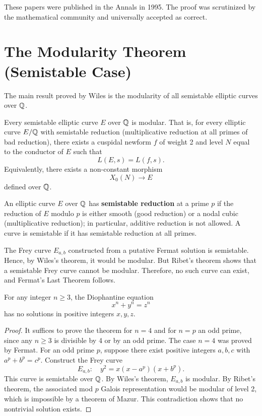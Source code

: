 These papers were published in the Annals in 1995. The proof was scrutinized by the mathematical community and universally accepted as correct.

\section{The Modularity Theorem (Semistable Case)}

The main result proved by Wiles is the modularity of all semistable elliptic curves over \(\mathbb{Q}\).

\begin{theorem}
Every semistable elliptic curve \(E\) over \(\mathbb{Q}\) is modular. That is, for every elliptic curve \(E/\mathbb{Q}\) with semistable reduction (multiplicative reduction at all primes of bad reduction), there exists a cuspidal newform \(f\) of weight 2 and level \(N\) equal to the conductor of \(E\) such that
\[
L(E,s) = L(f,s).
\]
Equivalently, there exists a non-constant morphism
\[
X_0(N) \to E
\]
defined over \(\mathbb{Q}\).
\end{theorem}

An elliptic curve \(E\) over \(\mathbb{Q}\) has \textbf{semistable reduction} at a prime \(p\) if the reduction of \(E\) modulo \(p\) is either smooth (good reduction) or a nodal cubic (multiplicative reduction); in particular, additive reduction is not allowed. A curve is semistable if it has semistable reduction at all primes.

The Frey curve \(E_{a,b}\) constructed from a putative Fermat solution is semistable. Hence, by Wiles's theorem, it would be modular. But Ribet's theorem shows that a semistable Frey curve cannot be modular. Therefore, no such curve can exist, and Fermat's Last Theorem follows.

\begin{theorem}
For any integer \(n \geq 3\), the Diophantine equation
\[
x^n + y^n = z^n
\]
has no solutions in positive integers \(x, y, z\).
\end{theorem}

\begin{proof}
It suffices to prove the theorem for \(n = 4\) and for \(n = p\) an odd prime, since any \(n \geq 3\) is divisible by 4 or by an odd prime. The case \(n = 4\) was proved by Fermat. For an odd prime \(p\), suppose there exist positive integers \(a, b, c\) with \(a^p + b^p = c^p\). Construct the Frey curve
\[
E_{a,b}: \quad y^2 = x(x - a^p)(x + b^p).
\]
This curve is semistable over \(\mathbb{Q}\). By Wiles's theorem, \(E_{a,b}\) is modular. By Ribet's theorem, the associated mod \(p\) Galois representation would be modular of level 2, which is impossible by a theorem of Mazur. This contradiction shows that no nontrivial solution exists.
\end{proof}

